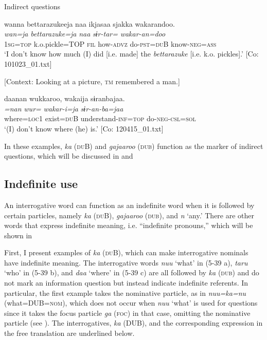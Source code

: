 \ea \label{ex:5:38}   Indirect questions

 \ea \label{ex:5:a} %
\glll  wanna  {\textbar}bettarazukee{\textbar}ja  naa  ikjasaa  sjakka  wakarandoo.\\
\textit{wan=ja}  \textit{bettarazuke=ja}  \textit{naa}  \textit{}  \textit{sɨr-tar=}  \textit{wakar-an=doo}\\
1\textsc{sg}=\textsc{top}  k.o.pickle=TOP  \textsc{fil}  how-\textsc{advz}  do-\textsc{pst}=\textsc{du}B  know-\textsc{neg}=\textsc{ass}\\
\glt ‘I don’t know how much (I) did [i.e. made] the \textit{bettarazuke} [i.e. k.o. pickles].’ [Co: 101023\_01.txt]

 \ex \label{ex:5:b} [Context: Looking at a picture, \textsc{tm} remembered a man.]

\glll  daanan  wukkaroo,  wakaija  sɨranbajaa.\\
\textit{=nan}  \textit{wur=}  \textit{wakar-i=ja}  \textit{sɨr-an-ba=jaa}\\
where=\textsc{loc}1  exist=\textsc{du}B  understand-\textsc{inf}=\textsc{top}  do-\textsc{neg}-\textsc{csl}=\textsc{sol}\\
\glt ‘(I) don’t know where (he) is.’ [Co: 120415\_01.txt]
\z
\z

In these examples, \textit{ka} (\textsc{du}B) and \textit{gajaaroo} (\textsc{dub}) function as the marker of indirect questions, which will be discussed in  and 

\subsection{Indefinite use}

An interrogative word can function as an indefinite word when it is followed by certain particles, namely \textit{ka} (\textsc{du}B), \textit{gajaaroo} (\textsc{dub}), and \textit{n} ‘any.’ There are other words that express indefinite meaning, i.e. “indefinite pronouns,” which will be shown in 

  First, I present examples of \textit{ka} (\textsc{du}B), which can make interrogative nominals have indefinite meaning. The interrogative words \textit{nuu} ‘what’ in (5-39 a), \textit{taru} ‘who’ in (5-39 b), and \textit{daa} ‘where’ in (5-39 c) are all followed by \textit{ka} (\textsc{dub}) and do not mark an information question but instead indicate indefinite referents. In particular, the first example takes the nominative particle, as in \textit{nuu=ka=nu} (what=DUB=\textsc{nom}), which does not occur when \textit{nuu} ‘what’ is used for questions since it takes the focus particle \textit{ga} (\textsc{foc}) in that case, omitting the nominative particle (see ). The interrogatives, \textit{ka} (DUB), and the corresponding expression in the free translation are underlined below.

